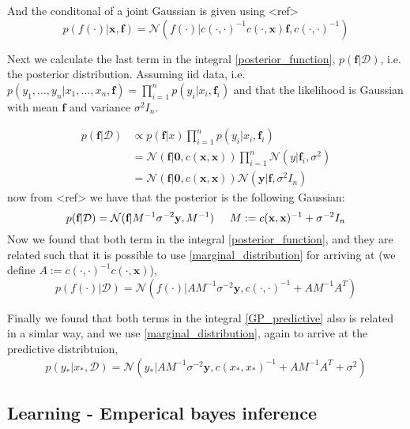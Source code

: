 And the conditonal of a joint Gaussian is given using <ref> 
$$p(f(\cdot)|\textbf{x}, \textbf{f}) = \mathcal{N}(f(\cdot)|c(\cdot, \cdot)^{-1}c(\cdot, \textbf{x})\textbf{f}, c(\cdot, \cdot)^{-1})$$

Next we calculate the last term in the integral \eqref{posterior_function}, 
$p(\textbf{f}|\mathcal{D})$, i.e. the posterior distribution. Assuming iid data, 
i.e. $p(y_1,\dots, y_n|x_1,\dots, x_n, \textbf{f}) = \prod_{i=1}^n p(y_i|x_i,\textbf{f}_i)$
and that the likelihood is Gaussian with mean $\textbf{f}$ and variance $\sigma^2 I_n$. 

\begin{align*}
    p(\textbf{f}|\mathcal{D}) &\propto p(\textbf{f}|x)\prod_{i=1}^n p(y_i|x_i,\textbf{f}_i)\\
    &= \mathcal{N}(\textbf{f}|\textbf{0},c(\textbf{x}, \textbf{x})) \prod_{i=1}^n \mathcal{N}(y|\textbf{f}_i,\sigma^2)\\
    &= \mathcal{N}(\textbf{f}|\textbf{0}, c(\textbf{x}, \textbf{x})) \mathcal{N}(\textbf{y}|\textbf{f},\sigma^2 I_n)
\end{align*}
now from <ref> we have that the posterior is the following Gaussian: 
\begin{equation*}
    p(\textbf{f}|\mathcal{D}) = \mathcal{N}(\textbf{f}|M^{-1} \sigma^{-2}\textbf{y}, M^{-1}) \hspace{0.5cm}M := c(\textbf{x}, \textbf{x})^{-1}+\sigma^{-2} I_n
\end{equation*}
Now we found that both term in the integral \eqref{posterior_function}, and they
are related such that it is possible to use \eqref{marginal_distribution} for arriving 
at (we define $A :=  c(\cdot, \cdot)^{-1} c(\cdot, \textbf{x})$), 
$$p(f(\cdot)|\mathcal{D}) = \mathcal{N}(f(\cdot)|AM^{-1}\sigma^{-2}\textbf{y}, c(\cdot, \cdot)^{-1}+
AM^{-1}A^T)$$

Finally we found that both terms in the integral \eqref{GP_predictive} also is related
in a simlar way, and we use \eqref{marginal_distribution}, again to arrive at the predictive
distribtuion, 
$$p(y_*|x_*,\mathcal{D}) = \mathcal{N}(y_*|AM^{-1}\sigma^{-2}\textbf{y}, c(x_*, x_*)^{-1}+
AM^{-1}A^T+\sigma^2)$$


\subsection*{Learning - Emperical bayes inference}


